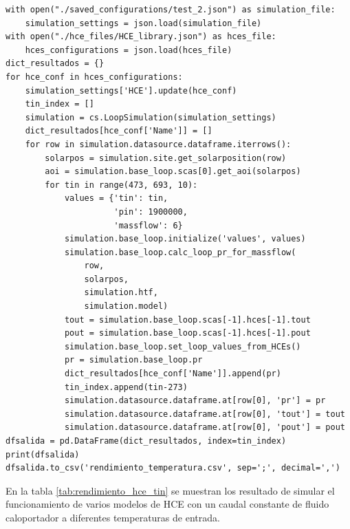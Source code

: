 \begin{lstlisting}[caption=Programa para el análisis del rendimiento en función de $T_{in}$, label={lst:script_test2}]
with open("./saved_configurations/test_2.json") as simulation_file:
    simulation_settings = json.load(simulation_file)
with open("./hce_files/HCE_library.json") as hces_file:
    hces_configurations = json.load(hces_file)
dict_resultados = {}
for hce_conf in hces_configurations:
    simulation_settings['HCE'].update(hce_conf)
    tin_index = []
    simulation = cs.LoopSimulation(simulation_settings)
    dict_resultados[hce_conf['Name']] = []
    for row in simulation.datasource.dataframe.iterrows():
        solarpos = simulation.site.get_solarposition(row)
        aoi = simulation.base_loop.scas[0].get_aoi(solarpos)
        for tin in range(473, 693, 10):
            values = {'tin': tin,
                      'pin': 1900000,
                      'massflow': 6}
            simulation.base_loop.initialize('values', values)
            simulation.base_loop.calc_loop_pr_for_massflow(
                row,
                solarpos,
                simulation.htf,
                simulation.model)
            tout = simulation.base_loop.scas[-1].hces[-1].tout
            pout = simulation.base_loop.scas[-1].hces[-1].pout
            simulation.base_loop.set_loop_values_from_HCEs()
            pr = simulation.base_loop.pr
            dict_resultados[hce_conf['Name']].append(pr)
            tin_index.append(tin-273)
            simulation.datasource.dataframe.at[row[0], 'pr'] = pr
            simulation.datasource.dataframe.at[row[0], 'tout'] = tout
            simulation.datasource.dataframe.at[row[0], 'pout'] = pout
dfsalida = pd.DataFrame(dict_resultados, index=tin_index)
print(dfsalida)
dfsalida.to_csv('rendimiento_temperatura.csv', sep=';', decimal=',')
\end{lstlisting}

En la tabla \ref{tab:rendimiento_hce_tin} se muestran los resultado de simular el funcionamiento de varios modelos de HCE con un caudal constante de fluido caloportador a diferentes temperaturas de entrada.

